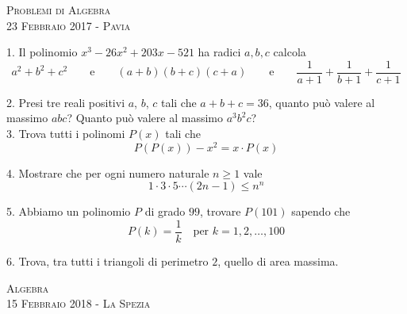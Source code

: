 \documentclass[a4paper]{article}
\theoremstyle{remark}
\theoremstyle{definition}
\begin{document}
\newpage
{}
\begin{center}
	\vspace*{0,5 cm}
	{\Huge \textsc{Problemi di Algebra}} \\
	\vspace{0,5 cm}
	\textsc{\Author} \hspace{1cm} \textsc{23 Febbraio 2017 - Pavia}
	\thispagestyle{empty}
	\vspace{0,7 cm}
\end{center}
\normalsize


1. Il polinomio $ x^3 -26x^2 + 203x - 521 $ ha radici $a, b, c$ calcola 
\[ a^2 + b^2 + c^2 \qquad\text{e}\qquad (a+b)(b+c)(c+a) \qquad\text{e}\qquad \frac{1}{a+1}+\frac{1}{b+1}+\frac{1}{c+1}\]

2. Presi tre reali positivi $a$, $b$, $c$ tali che $a+b+c = 36$, quanto può valere al massimo $abc$? Quanto può valere al massimo $a^3b^2c$? \\

3. Trova tutti i polinomi $ P(x) $ tali che
\[ P(P(x)) - x^2 = x\cdot P(x) \]

4. Mostrare che per ogni numero naturale $ n \geq 1 $ vale
\[ 1 \cdot 3 \cdot 5 \cdots (2n-1) \leq n^n \]

5. Abbiamo un polinomio $ P $ di grado $ 99 $, trovare $ P(101) $ sapendo che
\[ P(k) = \frac{1}{k} \quad \text{per } k = 1, 2, \dots, 100 \]

6. Trova, tra tutti i triangoli di perimetro $2$, quello di area massima. \\

\newpage
\begin{center}
	\vspace*{0,5 cm}
	{\Huge \textsc{Algebra}} \\
	\vspace{0,5 cm}
	\textsc{\Author} \hspace{1cm} \textsc{15 Febbraio 2018 - La Spezia}
	\thispagestyle{empty}
	\vspace{0,7 cm}
\end{center}
\normalsize
\end{document}
